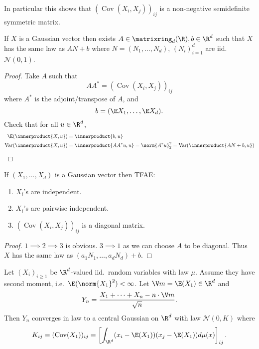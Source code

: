 \documentclass[a4paper]{article}
\DeclareMathOperator{\var}{Var} %
\newcommand*{\ip}{\innerproduct} %
\DeclareMathOperator{\cov}{Cov} %
\begin{document}
In particular this shows that \((\cov(X_i, X_j))_{ij}\) is a non-negative semidefinite symmetric matrix.

\begin{proposition}
  If \(X\) is a Gaussian vector then exists \(A \in \matrixring_d(\R), b \in \R^d\) such that \(X\) has the same law as \(A N + b\) where \(N = (N_1, \dots, N_d)\), \((N_i)_{i = 1}^d\) are iid.\ \(\mathcal N(0, 1)\).
\end{proposition}

\begin{proof}
  Take \(A\) such that
  \[
    AA^* = (\cov(X_i, X_j))_{ij}
  \]
  where \(A^*\) is the adjoint/transpose of \(A\), and
  \[
    b = (\E X_1, \dots, \E X_d).
  \]
  Check that for all \(u \in \R^d\),
  \begin{align*}
    \E(\ip{X, u}) &= \ip{b, u} \\
    \var(\ip{X, u}) &= \ip{AA^* u, u} = \norm{A^* u}_2^2 = \var(\ip{AN + b, u})
  \end{align*}
\end{proof}

\begin{proposition}
  If \((X_1, \dots, X_d)\) is a Gaussian vector then TFAE:
  \begin{enumerate}
  \item \(X_i\)'s are independent.
  \item \(X_i\)'s are pairwise independent.
  \item \((\cov(X_i, X_j))_{ij}\) is a diagonal matrix.
  \end{enumerate}
\end{proposition}

\begin{proof}
  \(1 \implies 2 \implies 3\) is obvious. \(3 \implies 1\) as we can choose \(A\) to be diagonal. Thus \(X\) has the same law as \((a_1N_1, \dots, a_dN_d) + b\).
\end{proof}

\begin{theorem}
  Let \((X_i)_{i \geq 1}\) be \(\R^d\)-valued iid.\ random variables with law \(\mu\). Assume they have second moment, i.e.\ \(\E(\norm{X_1}^2) < \infty\). Let \(\V m = \E(X_1) \in \R^d\) and
  \[
    Y_n = \frac{X_1 + \dots + X_n - n \cdot \V m}{\sqrt n}.
  \]
  Then \(Y_n\) converges in law to a central Gaussian on \(\R^d\) with law \(\mathcal N(0, K)\) where
  \[
    K_{ij} = (\cov(X_1))_{ij} = \left[ \int_{\R^d} (x_i - \E(X_1)) (x_j - \E(X_1)) d \mu(x) \right]_{ij}.
  \]
\end{theorem}
\end{document}
